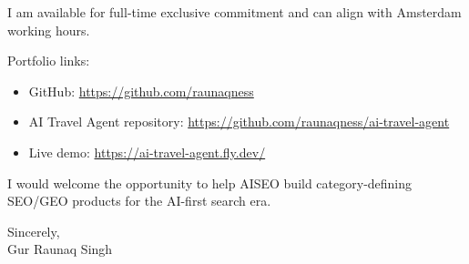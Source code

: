 \documentclass[11pt]{article}
\begin{document}
I am available for full-time exclusive commitment and can align with Amsterdam working hours.

Portfolio links:

\begin{itemize}
  \item GitHub: \url{https://github.com/raunaqness}
  \item AI Travel Agent repository: \url{https://github.com/raunaqness/ai-travel-agent}
  \item Live demo: \url{https://ai-travel-agent.fly.dev/}
\end{itemize}

I would welcome the opportunity to help AISEO build category-defining SEO/GEO products for the AI-first search era.

Sincerely,\\
Gur Raunaq Singh
\end{document}
